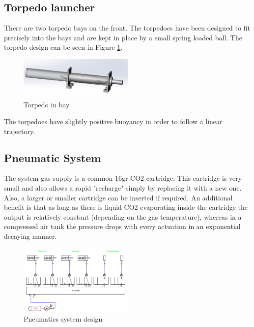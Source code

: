 \subsection{Torpedo launcher}
There are two torpedo  bays on the front. The torpedoes have been designed to fit precisely into the bays and are kept in place by a small spring loaded ball. The torpedo design can be seen in Figure \ref{fig:torpedo}.

\begin{figure}[h]
    \includegraphics[width=0.5\textwidth]{./figure/torpedo_loaded.png}
    \caption{Torpedo in bay}
    \label{fig:torpedo}
\end{figure}

The torpedoes have slightly positive buoyancy in order to follow a linear trajectory. 

\subsection{Pneumatic System}
The system gas supply is a common 16gr CO2 cartridge. This cartridge is very small and also allows a rapid "recharge" simply by replacing it with a new one. Also, a larger or smaller cartridge can be inserted if required. An additional benefit is that as long as there is liquid CO2 evaporating inside the cartridge the output is relatively constant (depending on the gas temperature), whereas in a compressed air tank the pressure drops with every actuation in an exponential decaying manner.

\begin{figure}[h]
    \includegraphics[width=0.5\textwidth]{./figure/pneumatics.png}
    \caption{Pneumatics system design}
    \label{fig:pneumatics}
\end{figure}

